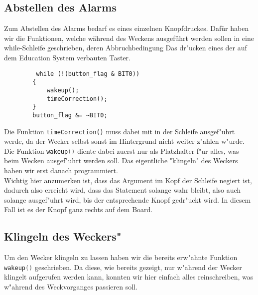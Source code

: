 \documentclass[openright,twoside,11pt,a4paper]{scrartcl}
\begin{document}
\begin{flushleft}
	 	\subsection{Abstellen des Alarms}
	 	Zum Abstellen des Alarms bedarf es eines einzelnen Knopfdruckes. Dafür haben wir die Funktionen, welche während des Weckens ausgeführt werden sollen in eine while-Schleife geschrieben, deren Abbruchbedingung Das dr"ucken eines der auf dem Education System verbauten Taster. 
	 	\begin{lstlisting}
	 	 while (!(button_flag & BIT0))
	 	{
	 		wakeup();
	 		timeCorrection();
	 	}
	 	button_flag &= ~BIT0;
	 	\end{lstlisting}
	 	Die Funktion \lstinline[language=c==++]|timeCorrection()| muss dabei mit in der Schleife ausgef"uhrt werde, da der Wecker selbst sonst im Hintergrund nicht weiter z"ahlen w"urde. Die Funktion \lstinline[language=c++]|wakeup()| diente dabei zuerst nur als Platzhalter f"ur alles, was beim Wecken ausgef"uhrt werden soll. Das eigentliche "klingeln" des Weckers haben wir erst danach programmiert. \\
	 	Wichtig hier anzumerken ist, dass das Argument im Kopf der Schleife negiert ist, dadurch also erreicht wird, dass das Statement solange wahr bleibt, also auch solange ausgef"uhrt wird, bis der entsprechende Knopf gedr"uckt wird. In diesem Fall ist es der Knopf ganz rechts auf dem Board. \\
	 	\subsection{Klingeln des Weckers"}
	 	Um den Wecker klingeln zu lassen haben wir die bereits erw"ahnte Funktion \lstinline[language=c++]|wakeup()| geschrieben. Da diese, wie bereits gezeigt, nur w"ahrend der Wecker klingelt aufgerufen werden kann, konnten wir hier einfach alles reinschreiben, was w"ahrend des Weckvorganges passieren soll.

	\end{flushleft}
\end{document}
